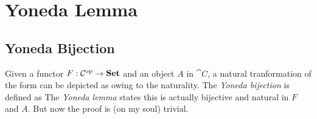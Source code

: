 \section{Yoneda Lemma}

\subsection{Yoneda Bijection}

Given a functor $F : \mathcal{C}^{\operatorname{op}} \to \boldsymbol{\mathrm{Set}}$ and an object $A$ in $\cat{C}$, %
a natural tranformation of the form
can be depicted as
owing to the naturality. The \textit{Yoneda bijection} is defined as 
The \textit{Yoneda lemma} states this is actually bijective and natural in $F$ and $A$. %
But now the proof is (on my soul) trivial.


